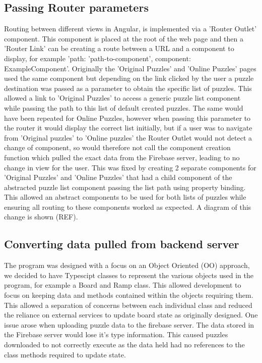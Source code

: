 \documentclass{l4proj}
\begin{document}
\subsection{Passing Router parameters}
Routing between different views in Angular, is implemented via a 'Router Outlet' component. This component is placed at the root of the web page and then a 'Router Link' can be creating a route between a URL and a component to display, for example '{path: 'path-to-component', component: ExampleComponent}'. Originally the 'Original Puzzles' and 'Online Puzzles' pages used the same component but depending on the link clicked by the user a puzzle destination was passed as a parameter to obtain the specific list of puzzles. This allowed a link to 'Original Puzzles' to access a generic puzzle list component while passing the path to this list of default created puzzles. The same would have been repeated for Online Puzzles, however when passing this parameter to the router it would display the correct list initially, but if a user was to navigate from 'Original puzzles' to 'Online puzzles' the Router Outlet would not detect a change of component, so would therefore not call the component creation function which pulled the exact data from the Firebase server, leading to no change in view for the user. This was fixed by creating 2 separate components for 'Original Puzzles' and 'Online Puzzles' that had a child component of the abstracted puzzle list component passing the list path using property binding. This allowed an abstract components to be used for both lists of puzzles while ensuring all routing to these components worked as expected. A diagram of this change is shown (REF). 

\subsection{Converting data pulled from backend server}

The program was designed with a focus on an Object Oriented (OO) approach, we decided to have Typescipt classes to represent the various objects used in the program, for example a Board and Ramp class. This allowed development to focus on keeping data and methods contained within the objects requiring them. This allowed a separation of concerns between each individual class and reduced the reliance on external services to update board state as originally designed. One issue arose when uploading puzzle data to the firebase server. The data stored in the Firebase server would lose it's type information. This caused puzzles downloaded to not correctly execute as the data held had no references to the class methods required to update state. 
\end{document}
